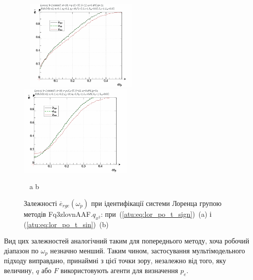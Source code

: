 \begin{figure}[ht!]
  \begin{center}
    ~ \hfill
    \includegraphics[width=0.49\textwidth]{p/cha/lor/Fq3zlovnAAF/lor_Fq3zlovnAAF_qx2-p_omega_p_e_sign.png}
    \hfill
    \includegraphics[width=0.49\textwidth]{p/cha/lor/Fq3zlovnAAF/lor_Fq3zlovnAAF_qx2-p_omega_p_e_sin.png}
    \hfill ~
  \end{center}
  \vspace{-1.0ex}
  \begin{center}
    ~ \hfill a \hfill\hfill b \hfill ~
  \end{center}
  \vspace{-1.5ex}
  \caption{Залежності $ \overline{e}_{rge} (\omega_p) $ при ідентифікації системи Лоренца групою методів Fq3zlovnAAF.$q_{x^2} $: при~(\ref{atu:eq:lor_po_t_sign})~(a) і (\ref{atu:eq:lor_po_t_sin})~(b)}
\label{atu:f:lor_Fq3zlovnAAF_e_omega_p}
\end{figure}

Вид цих залежностей аналогічний таким для попереднього методу,
хоча робочий діапазон по
$ \omega_p $ незначно менший. Таким чином, застосування мультімодельного
підходу виправдано, принаймні з цієї точки зору, незалежно
від того, яку величину,
$ q $ або
$ F $ використовують агенти для визначення
$ p_e $.




